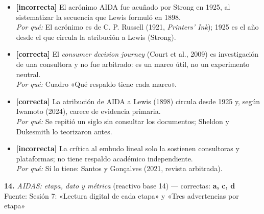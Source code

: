 \documentclass[10pt,letterpaper]{article}
\begin{document}
\begin{itemize}[leftmargin=1.2em,itemsep=0pt,topsep=1pt,parsep=0pt]
\item[\textbf{a)}] {\footnotesize \textbf{[incorrecta]} El acrónimo AIDA fue acuñado por Strong en 1925, al sistematizar la secuencia que Lewis formuló en 1898.\\ \textit{Por qué:} El acrónimo es de C. P. Russell (1921, \textit{Printers' Ink}); 1925 es el año desde el que circula la atribución a Lewis (Strong).}
\item[\textbf{b)}] {\footnotesize \textbf{[correcta]} El \textit{consumer decision journey} (Court et al., 2009) es investigación de una consultora y no fue arbitrado: es un marco útil, no un experimento neutral.\\ \textit{Por qué:} Cuadro «Qué respaldo tiene cada marco».}
\item[\textbf{c)}] {\footnotesize \textbf{[correcta]} La atribución de AIDA a Lewis (1898) circula desde 1925 y, según Iwamoto (2024), carece de evidencia primaria.\\ \textit{Por qué:} Se repitió un siglo sin consultar los documentos; Sheldon y Dukesmith lo teorizaron antes.}
\item[\textbf{d)}] {\footnotesize \textbf{[incorrecta]} La crítica al embudo lineal solo la sostienen consultoras y plataformas; no tiene respaldo académico independiente.\\ \textit{Por qué:} Sí lo tiene: Santos y Gonçalves (2021, revista arbitrada).}
\end{itemize}
\vspace{3pt}\noindent\textbf{14.} \textit{AIDAS: etapa, dato y métrica} (reactivo base 14) — correctas: \textbf{a, c, d}\\[-1pt]
{\scriptsize Fuente: Sesión 7: «Lectura digital de cada etapa» y «Tres advertencias por etapa»}
\end{document}
